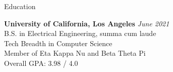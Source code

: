 \documentclass[ 10.5pt ]{resume}
\begin{document}

\begin{rSection}{Education}

	\textbf{University of California, Los Angeles} \hfill \textit{June 2021} \\
	B.S. in Electrical Engineering, summa cum laude \\
	Tech Breadth in Computer Science \\
	Member of Eta Kappa Nu and Beta Theta Pi \\
	Overall GPA: 3.98 / 4.0

\end{rSection}

\end{document}

